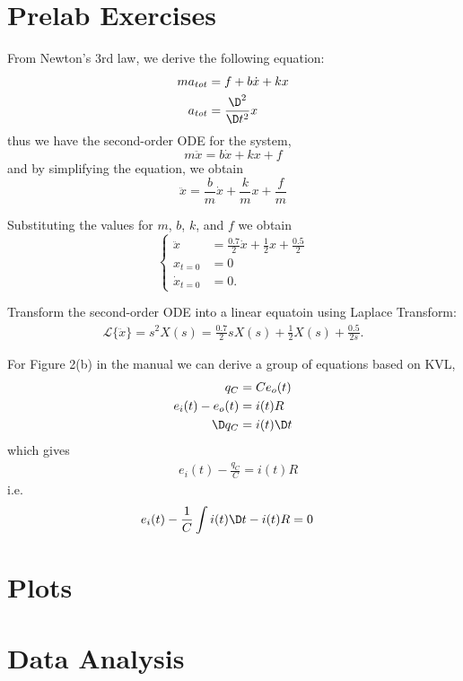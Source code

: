

\def\LABNUMBER{1}
\def\LABTITLE{Analog Simulation}



\makeMyTitle

\section*{Prelab Exercises}

From Newton's 3rd law, we derive the following equation:
\begin{align*}
  ma_{tot} &= f + b\dot{x}+kx \\
  a_{tot} &= \frac{\D^2}{\D t^2} x
\end{align*}
thus we have the second-order ODE for the system,
\begin{equation*}
  m\ddot{x}=b\dot{x}+kx+f
\end{equation*}
and by simplifying the equation, we obtain
\begin{equation*}
  \ddot{x}=\frac{b}{m}\dot{x}+\frac{k}{m}x+\frac{f}{m}
\end{equation*}

Substituting the values for $m$, $b$, $k$, and $f$ we obtain
\begin{equation}
  \begin{cases}
    \ddot{x}&=\frac{0.7}{2}\dot{x}+\frac{1}{2}x+\frac{0.5}{2}\\
    x_{t=0} &= 0 \\
    \dot{x}_{t=0} &= 0.
  \end{cases}
\end{equation}



Transform the second-order ODE into a linear equatoin using Laplace Transform:
\begin{align*}
  \mathcal{L}\lbrace {\ddot{x}} \rbrace = s^2 X(s)
                    = \frac{0.7}{2} sX(s) + \frac{1}{2} X(s) + \frac{0.5}{2s}.
\end{align*}



For Figure 2(b) in the manual we can derive a group of equations based on KVL,
\begin{align}
   q_C &= Ce_o(t) \\
  e_i(t) - e_o(t) &= i(t)R \\
  \D q_C &= i(t)\D t
\end{align}
which gives
\begin{align*}
  &e_i(t) - \frac{q_C}{C} = i(t) R
\end{align*}
i.e.
\begin{align*}
  &e_i(t) - \frac{1}{C}\int i(t)\D t- i(t)R = 0
\end{align*}

\section*{Plots}

\section*{Data Analysis}


